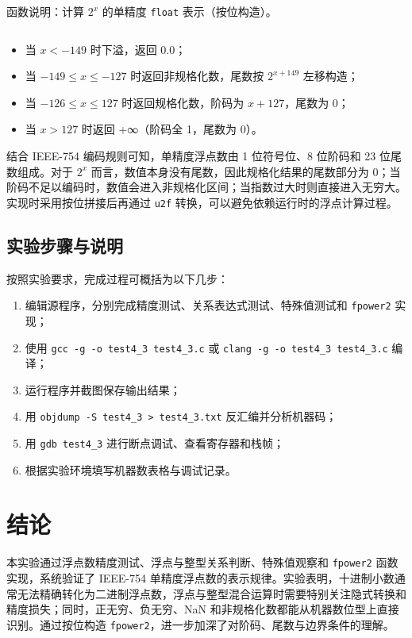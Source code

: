 \documentclass[12pt, a4paper]{academics}
\begin{document}
函数说明：计算 $2^{x}$ 的单精度 \texttt{float} 表示（按位构造）。

\inputminted{c}{../src/fpower2.c}

\begin{itemize}
    \item 当 $x<-149$ 时下溢，返回 0.0；
    \item 当 $-149\le x \le -127$ 时返回非规格化数，尾数按 $2^{x+149}$ 左移构造；
    \item 当 $-126\le x \le 127$ 时返回规格化数，阶码为 $x+127$，尾数为 0；
    \item 当 $x>127$ 时返回 +∞（阶码全 1，尾数为 0）。
\end{itemize}

结合 IEEE-754 编码规则可知，单精度浮点数由 1 位符号位、8 位阶码和 23 位尾数组成。对于 $2^x$ 而言，数值本身没有尾数，因此规格化结果的尾数部分为 0；当阶码不足以编码时，数值会进入非规格化区间；当指数过大时则直接进入无穷大。实现时采用按位拼接后再通过 \texttt{u2f} 转换，可以避免依赖运行时的浮点计算过程。

\subsection{实验步骤与说明}

按照实验要求，完成过程可概括为以下几步：

\begin{enumerate}
        \item 编辑源程序，分别完成精度测试、关系表达式测试、特殊值测试和 \texttt{fpower2} 实现；
        \item 使用 \texttt{gcc -g -o test4_3 test4_3.c} 或 \texttt{clang -g -o test4_3 test4_3.c} 编译；
        \item 运行程序并截图保存输出结果；
        \item 用 \texttt{objdump -S test4_3 > test4_3.txt} 反汇编并分析机器码；
        \item 用 \texttt{gdb test4_3} 进行断点调试、查看寄存器和栈帧；
        \item 根据实验环境填写机器数表格与调试记录。
\end{enumerate}

\section{结论}

本实验通过浮点数精度测试、浮点与整型关系判断、特殊值观察和 \texttt{fpower2} 函数实现，系统验证了 IEEE-754 单精度浮点数的表示规律。实验表明，十进制小数通常无法精确转化为二进制浮点数，浮点与整型混合运算时需要特别关注隐式转换和精度损失；同时，正无穷、负无穷、NaN 和非规格化数都能从机器数位型上直接识别。通过按位构造 \texttt{fpower2}，进一步加深了对阶码、尾数与边界条件的理解。
\end{document}
